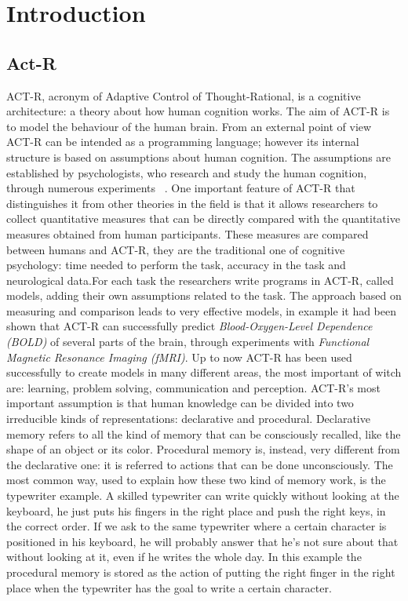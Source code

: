 \chapter{Introduction}
\section{Act-R}


ACT-R, acronym of Adaptive Control of Thought-Rational, is a cognitive architecture: a theory about how human cognition works. 
The aim of ACT-R is to model the behaviour of the human brain. From an external point of view ACT-R can be intended as a programming language; however its internal structure is based on assumptions about human cognition. The assumptions are established by psychologists, who research and study the human cognition, through numerous experiments ~\cite{Allen94}. 
One important feature of ACT-R that distinguishes it from other theories in the field is that it allows researchers to collect quantitative measures that can be directly compared with the quantitative measures obtained from human participants. These measures are compared between humans and ACT-R, they are the traditional one of cognitive psychology: time needed to perform the task, accuracy in the task and neurological data.For each task the researchers write programs in ACT-R, called models, adding their own assumptions related to the task. The approach based on measuring and comparison leads to very effective models, in example it had been shown that ACT-R can successfully predict \emph{Blood-Oxygen-Level Dependence (BOLD)} of several parts of the brain, through experiments with \emph{Functional Magnetic Resonance Imaging (fMRI)}.
Up to now ACT-R has been used successfully to create models in many different areas, the most important of witch are: learning, problem solving, communication and perception.
ACT-R's most important assumption is that human knowledge can be divided into two irreducible kinds of representations: declarative and procedural.
Declarative memory refers to all the kind of memory that can be consciously recalled, like the shape of an object or its color. Procedural memory is, instead, very different from the declarative one: it is referred to actions that can be done unconsciously. The most common way, used to explain how these two kind of memory work, is the typewriter example.
A skilled typewriter can write quickly without looking at the keyboard, he just puts his fingers in the right place and push the right keys, in the correct order. If we ask to the same typewriter where a certain character is positioned in his keyboard, he will probably answer that he's not sure about that without looking at it, even if he writes the whole day. In this example the procedural memory is stored as the action of putting the right finger in the right place when the typewriter has the goal to write a certain character.

